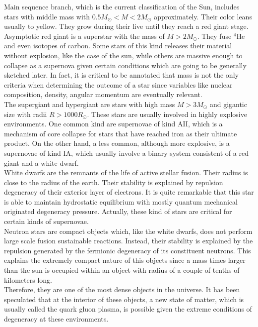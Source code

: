 \documentclass[openany]{book}
\begin{document}
Main sequence branch, which is the current classification of the Sun, includes stars with middle mass with $ 0.5M_{\odot} < M < 2M_{\odot}$ approximately. Their color leans usually to yellow. They grow during their live until they reach a red giant stage. \\

Asymptotic red giant is a superstar with the mass of $M > 2M_{\odot}$. They fuse $\mathrm{{}^{4}He}$ and even isotopes of carbon. Some stars of this kind releases their material without explosion, like the case of the sun, while others are massive enough to collapse as a supernova given certain conditions which are going to be generally sketched later. In fact, it is critical to be annotated that mass is not the only criteria when determining the outcome of a star since variables like nuclear composition, density, angular momentum are eventually relevant.  \\

The supergiant and hypergiant are stars with high mass $M > 3M_{\odot}$ and gigantic size with radii $R > 1000R_{\odot}$. These stars are usually involved in highly explosive environments. One common kind are supernovae of kind AII, which is a mechanism of core collapse for stars that have reached iron as their ultimate product. On the other hand, a less common, although more explosive, is a supernovae of kind IA, which usually involve a binary system consistent of a red giant and a white dwarf. \\

White dwarfs are the remnants of the life of active stellar fusion. Their radius is close to the radius of the earth. Their stability is explained by repulsion degeneracy of their exterior layer of electrons. It is quite remarkable that this star is able to maintain hydrostatic equilibrium with mostly quantum mechanical originated degeneracy pressure.  Actually, these kind of stars are critical for certain kinds of supernovae. \\ 

Neutron stars are compact objects which, like the white dwarfs, does not perform large scale fusion sustainable reactions. Instead, their stability is explained by the repulsion generated by the fermionic degeneracy of its constituent neutrons. This explains the extremely compact nature of this objects since a mass times larger than the sun is occupied within an object with radius of a couple of tenths of kilometers long. \\ 

Therefore, they are one of the most dense objects in the universe.  It has been speculated that  at the interior of these objects, a new state of matter, which is usually called the quark gluon plasma, is possible given the extreme conditions of degeneracy at these environments.\\ 
\end{document}
